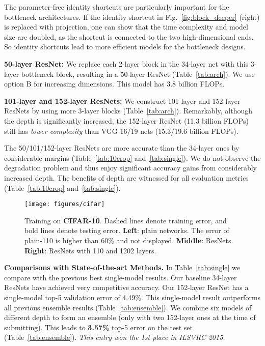 \documentclass{article}
\begin{document}
The parameter-free identity shortcuts are particularly important for the bottleneck architectures. If the identity shortcut in Fig.~\ref{fig:block_deeper} (right) is replaced with projection, one can show that the time complexity and model size are doubled, as the shortcut is connected to the two high-dimensional ends. So identity shortcuts lead to more efficient models for the bottleneck designs.

\textbf{50-layer ResNet:} We replace each 2-layer block in the 34-layer net with this 3-layer bottleneck block, resulting in a 50-layer ResNet (Table~\ref{tab:arch}). We use option B for increasing dimensions.
This model has 3.8 billion FLOPs.

\textbf{101-layer and 152-layer ResNets:} We construct 101-layer and 152-layer ResNets by using more 3-layer blocks (Table~\ref{tab:arch}).
Remarkably, although the depth is significantly increased, the 152-layer ResNet (11.3 billion FLOPs) still has \emph{lower complexity} than VGG-16/19 nets (15.3/19.6 billion FLOPs).

The 50/101/152-layer ResNets are more accurate than the 34-layer ones by considerable margins (Table~\ref{tab:10crop} and~\ref{tab:single}). We do not observe the degradation problem and thus enjoy significant accuracy gains from considerably increased depth. The benefits of depth are witnessed for all evaluation metrics (Table~\ref{tab:10crop} and~\ref{tab:single}).

\begin{figure*}[t]
\begin{center}
\texttt{[image: figures/cifar]}
\end{center}
\vspace{-1.5em}
\caption{Training on \textbf{CIFAR-10}. Dashed lines denote training error, and bold lines denote testing error. \textbf{Left}: plain networks. The error of plain-110 is higher than 60\% and not displayed. \textbf{Middle}: ResNets. \textbf{Right}: ResNets with 110 and 1202 layers.}
\label{fig:cifar}
\end{figure*}

\vspace{6pt}
\noindent\textbf{Comparisons with State-of-the-art Methods.}
In Table~\ref{tab:single} we compare with the previous best single-model results.
Our baseline 34-layer ResNets have achieved very competitive accuracy.
Our 152-layer ResNet has a single-model top-5 validation error of 4.49\%. This single-model result outperforms all previous ensemble results (Table~\ref{tab:ensemble}).
We combine six models of different depth to form an ensemble (only with two 152-layer ones at the time of submitting). This leads to \textbf{3.57\%} top-5 error on the test set (Table~\ref{tab:ensemble}). \emph{This entry won the 1st place in ILSVRC 2015.}
\end{document}
